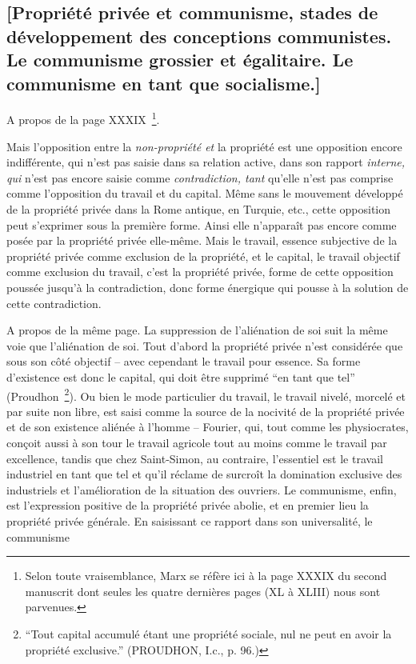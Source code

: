 \documentclass[french,twoside]{book} %
\begin{document}
\subsection[{[Propriété privée et communisme, stades de développement des conceptions communistes. Le communisme grossier et égalitaire. Le communisme en tant que socialisme.]}]{[Propriété privée et communisme, stades de développement des conceptions communistes. Le communisme grossier et égalitaire. Le communisme en tant que socialisme.]}
\noindent A propos de la page XXXIX \footnote{Selon toute vraisemblance, Marx se réfère ici à la page XXXIX du second manuscrit dont seules les quatre dernières pages (XL à XLIII) nous sont parvenues.}.\par
Mais l’opposition entre la \emph{non-propriété et} la propriété est une opposition encore indifférente, qui n’est pas saisie dans sa relation active, dans son rapport \emph{interne, qui} n’est pas encore saisie comme \emph{contradiction, tant} qu’elle n’est pas comprise comme l’opposition du travail et du capital. Même sans le mouvement développé de la propriété privée dans la Rome antique, en Turquie, etc., cette opposition peut s’exprimer sous la première forme. Ainsi elle n’apparaît pas encore comme posée par la propriété privée elle-même. Mais le travail, essence subjective de la propriété privée comme exclusion de la propriété, et le capital, le travail objectif comme exclusion du travail, c’est la propriété privée, forme de cette opposition poussée jusqu’à la contradiction, donc forme énergique qui pousse à la solution de cette contradiction.\par
A propos de la même page. La suppression de l’aliénation de soi suit la même voie que l’aliénation de soi. Tout d’abord la propriété privée n’est considérée que sous son côté objectif – avec cependant le travail pour essence. Sa forme d’existence est donc le capital, qui doit être supprimé “en tant que tel” (Proudhon \footnote{“Tout capital accumulé étant une propriété sociale, nul ne peut en avoir la propriété exclusive.” (PROUDHON, I.c., p. 96.)}). Ou bien le mode particulier du travail, le travail nivelé, morcelé et par suite non libre, est saisi comme la source de la nocivité de la propriété privée et de son existence aliénée à l’homme – Fourier, qui, tout comme les physiocrates, conçoit aussi à son tour le travail agricole tout au moins comme le travail par excellence, tandis que chez Saint-Simon, au contraire, l’essentiel est le travail industriel en tant que tel et qu’il réclame de surcroît la domination exclusive des industriels et l’amélioration de la situation des ouvriers. Le communisme, enfin, est l’expression positive de la propriété privée abolie, et en premier lieu la propriété privée générale. En saisissant ce rapport dans son universalité, le communisme\par
\end{document}

